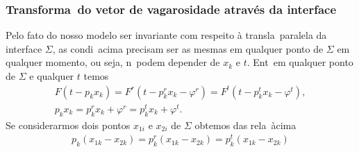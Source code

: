 \subsubsection{Transforma\cao\ do vetor de vagarosidade atrav\'es da interface}

Pelo fato do nosso modelo ser invariante com respeito \`a transla\cao\
paralela da interface $\Sigma$, as condi\coes\ acima precisam ser as
mesmas em qualquer ponto de $\Sigma$ em qualquer momento, ou seja, n\ao\
podem depender de $x_k$ e $t$. Ent\ao\ em qualquer ponto de $\Sigma$ e
qualquer $t$ temos
\begin{eqnarray}
F(t - p_k x_k) = F^r(t - p_k^r x_k - \varphi^r) = F^t(t - p_k^t x_k - \varphi^t),\\
p_k x_k = p_k^r x_k + \varphi^r = p_k^t x_k + \varphi^t.
\end{eqnarray}
Se considerarmos dois pontos $x_{1i}$ e $x_{2i}$ de $\Sigma$ obtemos das
rela\coes\ \`acima
\begin{eqnarray}
p_k(x_{1k} - x_{2k}) = p_k^r(x_{1k} - x_{2k}) = p_k^t(x_{1k} - x_{2k})
\end{eqnarray}

